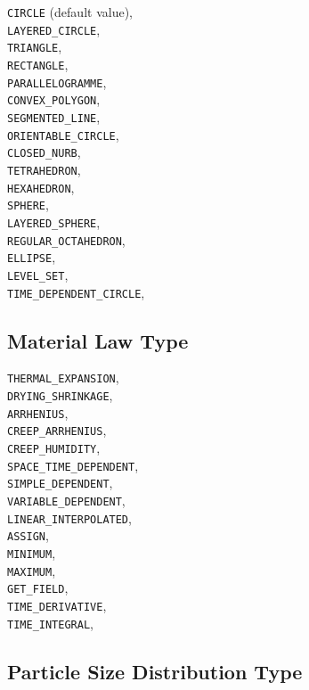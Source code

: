 \documentclass[10pt]{article}
\begin{document}
\verb+CIRCLE+ (default value),\\
\verb+LAYERED_CIRCLE+,\\
\verb+TRIANGLE+,\\
\verb+RECTANGLE+,\\
\verb+PARALLELOGRAMME+,\\
\verb+CONVEX_POLYGON+,\\
\verb+SEGMENTED_LINE+,\\
\verb+ORIENTABLE_CIRCLE+,\\
\verb+CLOSED_NURB+,\\
\verb+TETRAHEDRON+,\\
\verb+HEXAHEDRON+,\\
\verb+SPHERE+,\\
\verb+LAYERED_SPHERE+,\\
\verb+REGULAR_OCTAHEDRON+,\\
\verb+ELLIPSE+,\\
\verb+LEVEL_SET+,\\
\verb+TIME_DEPENDENT_CIRCLE+,\\

\subsection{Material Law Type}

\verb+THERMAL_EXPANSION+,\\
\verb+DRYING_SHRINKAGE+,\\
\verb+ARRHENIUS+,\\
\verb+CREEP_ARRHENIUS+,\\
\verb+CREEP_HUMIDITY+,\\
\verb+SPACE_TIME_DEPENDENT+,\\
\verb+SIMPLE_DEPENDENT+,\\
\verb+VARIABLE_DEPENDENT+,\\
\verb+LINEAR_INTERPOLATED+,\\
\verb+ASSIGN+,\\
\verb+MINIMUM+,\\
\verb+MAXIMUM+,\\
\verb+GET_FIELD+,\\
\verb+TIME_DERIVATIVE+,\\
\verb+TIME_INTEGRAL+,\\

\subsection{Particle Size Distribution Type}
\end{document}

